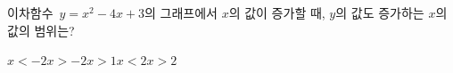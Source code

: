 이차함수~$y=x^2-4x+3$의 그래프에서 $x$의 값이 증가할 때, $y$의 값도 증가하는 $x$의 값의 범위는?
\begin{choices32}{$x<-2$}{$x>-2$}{$x>1$}{$x<2$}{$x>2$}\end{choices32}
